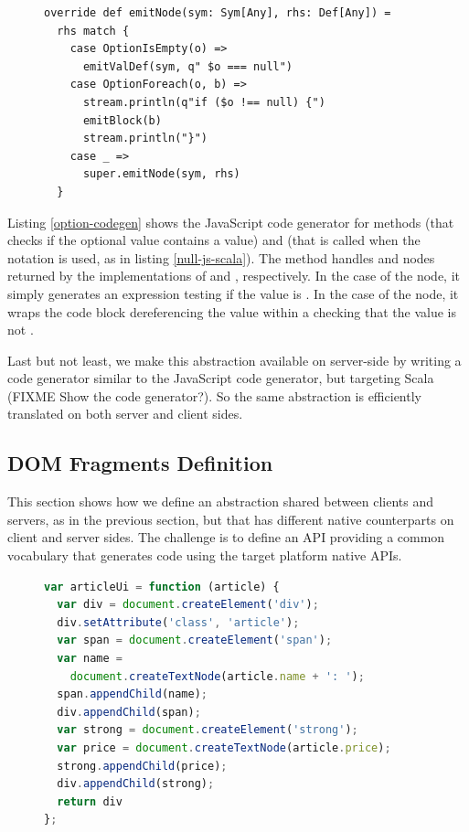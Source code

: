 \documentclass[preprint]{sigplanconf}
\begin{document}
\begin{figure}
\begin{lstlisting}[caption=JavaScript code generator for null references handling
DSL,label=option-codegen,captionpos=b]
override def emitNode(sym: Sym[Any], rhs: Def[Any]) =
  rhs match {
    case OptionIsEmpty(o) =>
      emitValDef(sym, q" $o === null")
    case OptionForeach(o, b) =>
      stream.println(q"if ($o !== null) {")
      emitBlock(b)
      stream.println("}")
    case _ =>
      super.emitNode(sym, rhs)
  }
\end{lstlisting}
\end{figure}

Listing \ref{option-codegen} shows the JavaScript code generator for methods  (that
checks if the optional value contains a value) and  (that is called when the
 notation is used, as in listing \ref{null-js-scala}). The  method handles
 and  nodes returned by the implementations of
 and , respectively. In the case of the  node, it
simply generates an expression testing if the value is . In the case of the
 node, it wraps the code block dereferencing the value within a 
checking that the value is not .

Last but not least, we make this abstraction available on server-side by writing a code generator
similar to the JavaScript code generator, but targeting Scala (FIXME Show the code generator?). So
the same abstraction is efficiently translated on both server and client sides.

\subsection{DOM Fragments Definition}

This section shows how we define an abstraction shared between clients and servers, as in the
previous section, but that has different native counterparts on client and server sides. The
challenge is to define an API providing a common vocabulary that generates code using the target
platform native APIs.

\begin{figure}
\begin{lstlisting}[language=JavaScript,caption=JavaScript DOM API,label=dom-api,captionpos=b]
var articleUi = function (article) {
  var div = document.createElement('div');
  div.setAttribute('class', 'article');
  var span = document.createElement('span');
  var name =
    document.createTextNode(article.name + ': ');
  span.appendChild(name);
  div.appendChild(span);
  var strong = document.createElement('strong');
  var price = document.createTextNode(article.price);
  strong.appendChild(price);
  div.appendChild(strong);
  return div
};
\end{lstlisting}
\end{figure}
\end{document}
